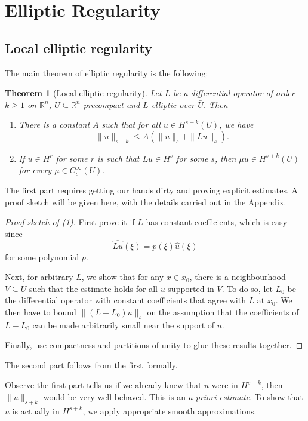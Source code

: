 \documentclass{shortart}
\newtheorem*{thm}{Theorem}
\theoremstyle{definition}
\newcommand\R{\mathbb{R}}
\begin{document}
\section{Elliptic Regularity}
\subsection{Local elliptic regularity}
The main theorem of elliptic regularity is the following:
\begin{thm}[Local elliptic regularity]
  Let $L$ be a differential operator of order $k \geq 1$ on $\R^n$, $U \subseteq \R^n$ precompact and $L$ elliptic over $\bar{U}$. Then
  \begin{enumerate}
    \item There is a constant $A$ such that for all $u \in H^{s + k}(U)$, we have
      \[
        \|u\|_{s + k} \leq A(\|u\|_s + \|Lu\|_s).
      \]
    \item If $u \in H^r$ for some $r$ is such that $Lu \in H^s$ for some $s$, then $\mu u \in H^{s + k}(U)$ for every $\mu \in C_c^\infty(U)$.
  \end{enumerate}
\end{thm}
The first part requires getting our hands dirty and proving explicit estimates. A proof sketch will be given here, with the details carried out in the Appendix.
\begin{proof}[Proof sketch of (1)]
  First prove it if $L$ has constant coefficients, which is easy since
  \[
    \widehat{Lu}(\xi) = p(\xi) \hat{u}(\xi)
  \]
  for some polynomial $p$.

  Next, for arbitrary $L$, we show that for any $x \in x_0$, there is a neighbourhood $V \subseteq U$ such that the estimate holds for all $u$ supported in $V$. To do so, let $L_0$ be the differential operator with constant coefficients that agree with $L$ at $x_0$. We then have to bound $\|(L - L_0)u\|_s$ on the assumption that the coefficients of $L - L_0$ can be made arbitrarily small near the support of $u$.

  Finally, use compactness and partitions of unity to glue these results together.
\end{proof}
The second part follows from the first formally.

Observe the first part tells us if we already knew that $u$ were in $H^{s + k}$, then $\|u\|_{s + k}$ would be very well-behaved. This is an \emph{a priori estimate}. To show that $u$ is actually in $H^{s + k}$, we apply appropriate smooth approximations.
\end{document}

